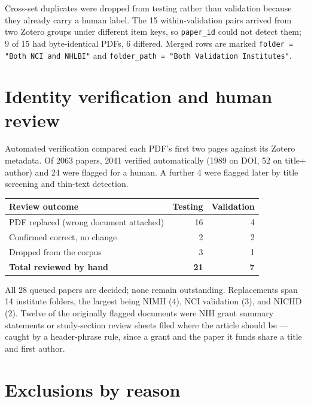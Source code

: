 \documentclass[11pt]{article}
\begin{document}
Cross-set duplicates were dropped from testing rather than validation because they already carry a human
label. The 15 within-validation pairs arrived from two Zotero groups under different item keys, so
\texttt{paper\_id} could not detect them; 9 of 15 had byte-identical PDFs, 6 differed. Merged rows are
marked \texttt{folder = "Both NCI and NHLBI"} and \texttt{folder\_path = "Both Validation Institutes"}.

\section{Identity verification and human review}

Automated verification compared each PDF's first two pages against its Zotero metadata. Of 2063 papers,
2041 verified automatically (1989 on DOI, 52 on title$+$author) and 24 were flagged for a human. A further
4 were flagged later by title screening and thin-text detection.

\begin{table}[h]
\centering
\begin{tabular}{lrr}
\toprule
\textbf{Review outcome} & \textbf{Testing} & \textbf{Validation} \\
\midrule
PDF replaced (wrong document attached) & 16 & 4 \\
Confirmed correct, no change & 2 & 2 \\
Dropped from the corpus & 3 & 1 \\
\midrule
\textbf{Total reviewed by hand} & \textbf{21} & \textbf{7} \\
\bottomrule
\end{tabular}
\end{table}

All 28 queued papers are decided; none remain outstanding. Replacements span 14 institute folders, the
largest being NIMH (4), NCI validation (3), and NICHD (2). Twelve of the originally flagged documents were
NIH grant summary statements or study-section review sheets filed where the article should be --- caught
by a header-phrase rule, since a grant and the paper it funds share a title and first author.

\section{Exclusions by reason}
\end{document}
